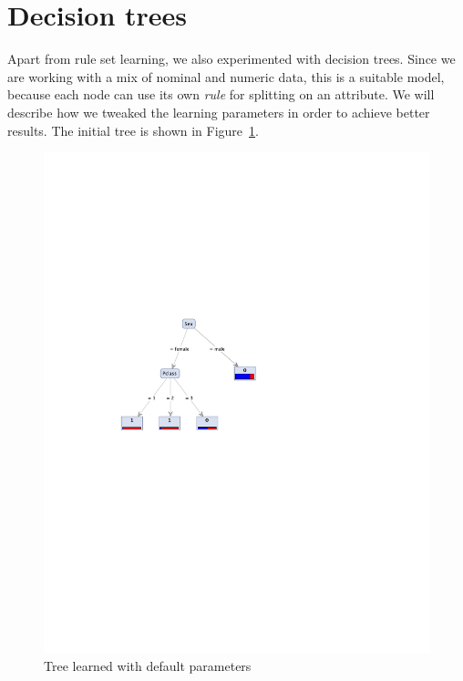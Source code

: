 \documentclass[12pt,a4paper]{article}
\begin{document}
\section{Decision trees}

Apart from rule set learning, we also experimented with decision trees. Since we are working with a mix of nominal and numeric data, this is a suitable model, because each node can use its own \emph{rule} for splitting on an attribute. We will describe how we tweaked the learning parameters in order to achieve better results. The initial tree is shown in Figure~\ref{fig:tree_initial}.


\begin{figure}[htbp]
  \centering
  \includegraphics[width = .6\textwidth]{tree_initial}
  \captionsetup{width=.8\textwidth}
  \caption{Tree learned with default parameters}
  \label{fig:tree_initial}
\end{figure}
\end{document}
